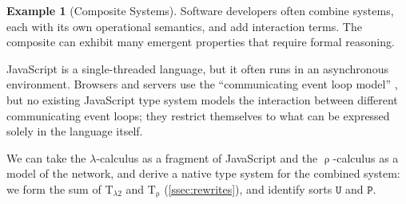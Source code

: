 \documentclass[12pt]{article}
\theoremstyle{definition}
\newtheorem{example}[theorem]{Example}
\newcommand{\mrm}[1]{\mathrm{#1}}
\newcommand{\mtt}[1]{\mathtt{#1}}
\newcommand{\T}{\mrm{T}}
\begin{document}
\begin{example}[Composite Systems]


Software developers often combine systems, each with its own operational semantics, and add interaction terms. The composite can exhibit many emergent properties that require formal reasoning.

JavaScript is a single-threaded language, but it often runs in an asynchronous environment. Browsers and servers use the ``communicating event loop model'' \cite{CEL},
but no existing JavaScript type system models the interaction between different communicating event loops; they restrict themselves to what can be expressed solely in the language itself.

We can take the $\lambda$-calculus as a fragment of JavaScript and the $\uprho$-calculus as a model of the network, and derive a native type system  for the combined system: we form the sum of $\T_{\lambda2}$ and $\T_\uprho$ (\ref{ssec:rewrites}), and identify sorts $\mtt{U}$ and $\mtt{P}$.


\end{example}
\end{document}
